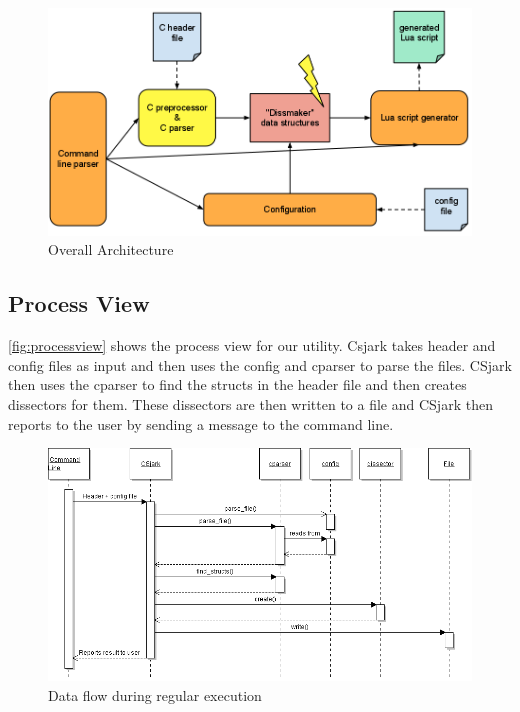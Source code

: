 \begin{figure}[htb]
	\includegraphics[width=\textwidth]{./planning/img/overall_design}
	\caption{Overall Architecture\label{fig:logicalview}}
\end{figure}


\subsection{Process View}
\autoref{fig:processview} shows the process view for our \gls{utility}. Csjark takes \gls{header} and config files as input and then uses the config and cparser to parse the files. CSjark then uses the cparser to find the \glspl{struct} in the \gls{header} file and then creates \glspl{dissector} for them. These \glspl{dissector} are then written to a file and CSjark then reports to the user by sending a message to the command line.

\begin{figure}[htb]
	\includegraphics[width=\textwidth]{./planning/img/SequenceDiagram}
	\caption{Data flow during regular execution\label{fig:processview}}
\end{figure}


